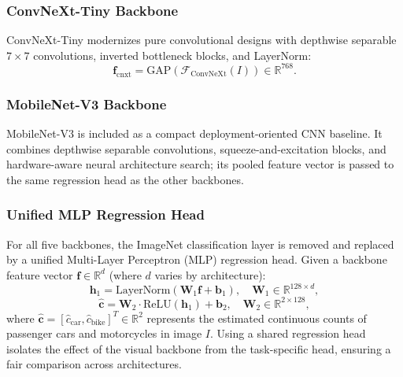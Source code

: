 \documentclass[journal,twocolumn]{IEEEtran}
\begin{document}
\subsubsection{ConvNeXt-Tiny Backbone}
ConvNeXt-Tiny \cite{convnext} modernizes pure convolutional designs with depthwise separable $7 \times 7$ convolutions, inverted bottleneck blocks, and LayerNorm:
\begin{equation}
\mathbf{f}_{\text{cnxt}} = \text{GAP}\left(\mathcal{F}_{\text{ConvNeXt}}(I)\right) \in \mathbb{R}^{768}.
\end{equation}

\subsubsection{MobileNet-V3 Backbone}
MobileNet-V3 \cite{mobilenet} is included as a compact deployment-oriented CNN baseline. It combines depthwise separable convolutions, squeeze-and-excitation blocks, and hardware-aware neural architecture search; its pooled feature vector is passed to the same regression head as the other backbones.

\subsubsection{Unified MLP Regression Head}
For all five backbones, the ImageNet classification layer is removed and replaced by a unified Multi-Layer Perceptron (MLP) regression head. Given a backbone feature vector $\mathbf{f} \in \mathbb{R}^{d}$ (where $d$ varies by architecture):
\begin{equation}
\mathbf{h}_1 = \text{LayerNorm}\left( \mathbf{W}_1 \mathbf{f} + \mathbf{b}_1 \right), \quad \mathbf{W}_1 \in \mathbb{R}^{128 \times d},
\end{equation}
\begin{equation}
\hat{\mathbf{c}} = \mathbf{W}_2 \cdot \text{ReLU}(\mathbf{h}_1) + \mathbf{b}_2, \quad \mathbf{W}_2 \in \mathbb{R}^{2 \times 128},
\end{equation}
where $\hat{\mathbf{c}} = [\hat{c}_{\text{car}}, \hat{c}_{\text{bike}}]^T \in \mathbb{R}^2$ represents the estimated continuous counts of passenger cars and motorcycles in image $I$. Using a shared regression head isolates the effect of the visual backbone from the task-specific head, ensuring a fair comparison across architectures.
\end{document}
